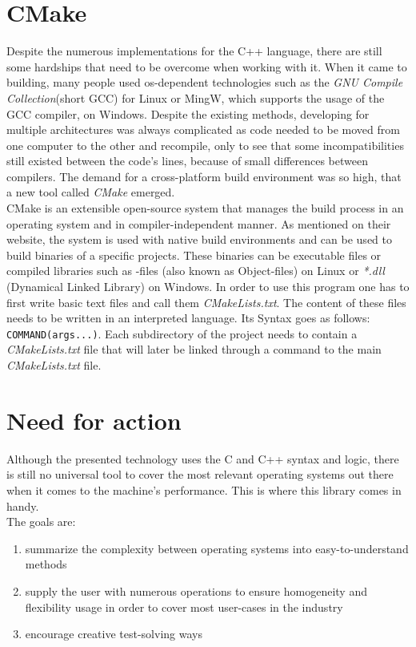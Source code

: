\section{CMake}
Despite the numerous implementations for the C++ language, there are still some hardships that need to be overcome when working with it. When it came to building, many people used os-dependent technologies such as the \textit{GNU Compile Collection}(short GCC) for Linux\cite{gcc} or MingW, which supports the usage of the GCC compiler, on Windows\cite{mingw}. Despite the existing methods, developing for multiple architectures was always complicated as code needed to be moved from one computer to the other and recompile, only to see that some incompatibilities still existed between the code's lines, because of small differences between compilers. The demand \dq for a cross-platform build environment\dq{} was so high, that a new tool called \textit{CMake} emerged.\\
\dq CMake is an extensible open-source system that manages the build process in an operating system and in compiler-independent manner\dq{}. As mentioned on their website, the system is used with native build environments and can be used to build binaries of a specific projects. These binaries can be executable files or compiled libraries such as -files (also known as Object-files) on Linux or \textit{*.dll} (Dynamical Linked Library) on Windows. In order to use this program one has to first write basic text files and call them \textit{CMakeLists.txt}. The content of these files needs to be written in an interpreted language. Its Syntax goes as follows: \texttt{COMMAND(args...)}. Each subdirectory of the project needs to contain a \textit{CMakeLists.txt} file that will later be linked through a command to the main \textit{CMakeLists.txt} file\cite{cmake-overview}. 

\section{Need for action}
Although the presented technology uses the C and C++ syntax and logic, there is still no universal tool to cover the most relevant operating systems out there when it comes to the machine's performance. This is where this library comes in handy.\\
The goals are:
\begin{enumerate}
	\item summarize the complexity between operating systems into easy-to-understand methods
	\item supply the user with numerous operations to ensure homogeneity and flexibility usage in order to cover most user-cases in the industry 
	\item  encourage creative test-solving ways   
\end{enumerate}
